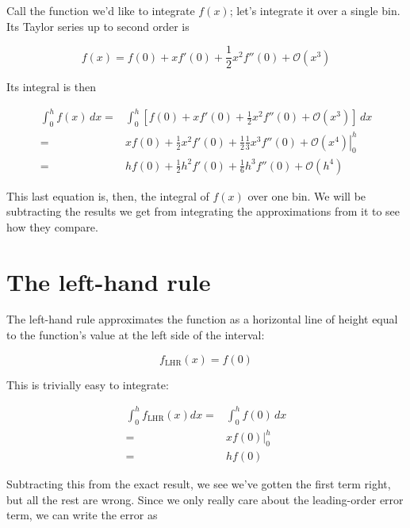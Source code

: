 \documentclass[12ampt]{article}   %
\begin{document}
Call the function we'd like to integrate $f(x)$; let's integrate it over a single bin. Its Taylor series up to second order is

\begin{equation}
  f(x) = f(0) + xf'(0) + \frac{1}{2} x^2 f''(0) + \mathcal O(x^3)
\end{equation}

Its integral is then

\begin{align}
  \int_0^h f(x) \,dx =& \int_0^h \left[ f(0) + xf'(0) + \frac{1}{2} x^2 f''(0) + \mathcal O(x^3) \right] \,dx \\
=& \left. xf(0) + \frac{1}{2}x^2f'(0) + \frac{1}{2}\frac{1}{3} x^3 f''(0) + \mathcal O(x^4) \right|^h_0 \\
  =& hf(0) + \frac{1}{2}h^2f'(0) + \frac{1}{6} h^3 f''(0) + \mathcal O(h^4) \label{eq-exact}
\end{align}

This last equation is, then, the integral of $f(x)$ over one bin. We will be subtracting the results we get from integrating the approximations from it to see how they compare.

\section{The left-hand rule}

The left-hand rule approximates the function as a horizontal line of height equal to the function's value at the left side of the interval:

\begin{equation}
  f_{\mathrm{LHR}}(x) = f(0)
\end{equation}

This is trivially easy to integrate:

\begin{align}
  \int_0^h f_{\mathrm{LHR}}(x) dx =& \int_0^h f(0) \, dx \\
  =& \left. xf(0) \right|^h_0 \\
  =&  hf(0) 
\end{align}

Subtracting this from the exact result, we see we've gotten the first term right, but all the rest are wrong. Since we only really care about the leading-order error term, 
we can write the error as
\end{document}
